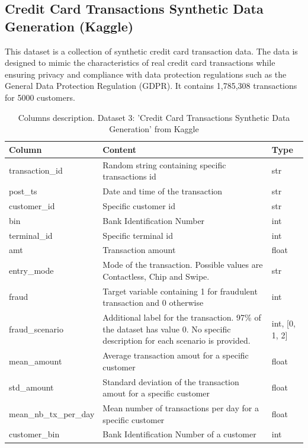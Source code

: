 \documentclass[12pt,a4paper, hidelinks]{article}
\begin{document}
\newpage

\subsection{Credit Card Transactions Synthetic Data Generation (Kaggle)}

This dataset is a collection of synthetic credit card transaction data. The data is designed to mimic the characteristics of real credit card transactions while ensuring privacy and compliance with data protection regulations such as the General Data Protection Regulation (GDPR). It contains 1,785,308 transactions for 5000 customers.

\begin{table}[ht!]
    \centering
    \begin{tabular}{|p{5.5cm}|p{8cm}|p{2cm}|}
    \hline
    \textbf{Column} & \textbf{Content} & \textbf{Type} \\
    \hline
    transaction\_id & Random string containing specific transactions id & str \\
    \hline
    post\_ts & Date and time of the transaction & str \\
    \hline
    customer\_id & Specific customer id & str \\
    \hline
    bin & Bank Identification Number & int \\
    \hline
    terminal\_id & Specific terminal id & int \\
    \hline
    amt & Transaction amount & float \\
    \hline
    entry\_mode & Mode of the transaction. Possible values are Contactless, Chip and Swipe. & str \\
    \hline 
    fraud & Target variable containing 1 for fraudulent transaction and 0 otherwise & int \\
    \hline
    fraud\_scenario & Additional label for the transaction. 97\% of the dataset has value 0. No specific description for each scenario is provided.  & int, [0, 1, 2] \\
    \hline
    mean\_amount & Average transaction amout for a specific customer  & float \\
    \hline
    std\_amount & Standard deviation of the transaction amout for a specific customer  & float \\
    \hline
    mean\_nb\_tx\_per\_day & Mean number of transactions per day for a specific customer & float \\
    \hline
    customer\_bin & Bank Identification Number of a customer & int \\
    \hline
    \end{tabular}
    \caption{Columns description. Dataset 3: 'Credit Card Transactions Synthetic Data Generation' from Kaggle}
\end{table}
\end{document}
